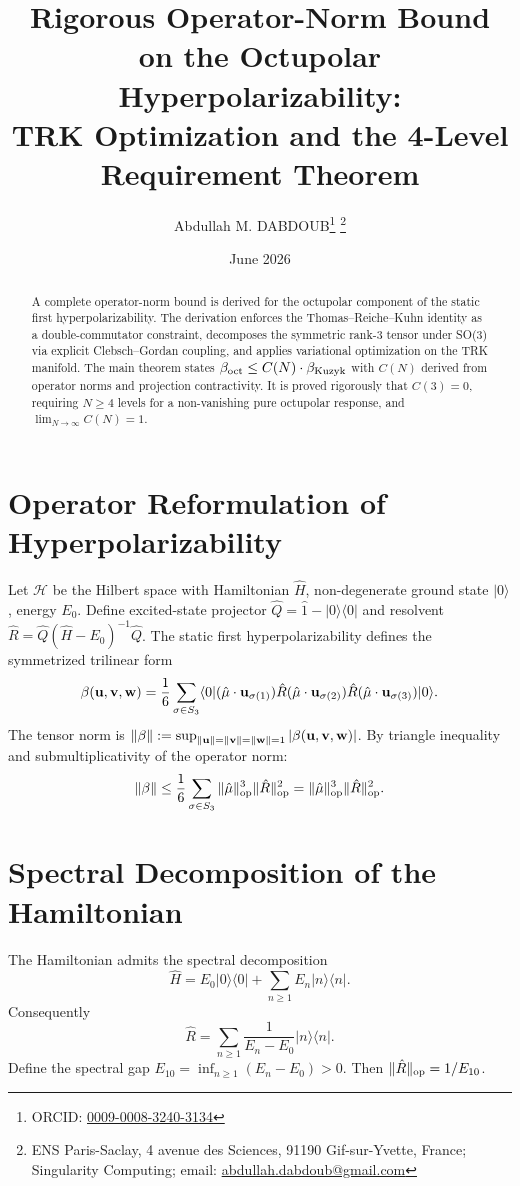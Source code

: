 \documentclass[11pt]{article}
\title{Rigorous Operator-Norm Bound on the Octupolar Hyperpolarizability:\\
TRK Optimization and the 4-Level Requirement Theorem}
\author{Abdullah M. DABDOUB\thanks{ORCID: \href{https://orcid.org/0009-0008-3240-3134}{0009-0008-3240-3134}}%
\thanks{ENS Paris-Saclay, 4 avenue des Sciences, 91190 Gif-sur-Yvette, France; Singularity Computing; email: \href{mailto:abdullah.dabdoub@gmail.com}{abdullah.dabdoub@gmail.com}}}
\date{June 2026}
\begin{document}
\maketitle

\begin{abstract}
A complete operator-norm bound is derived for the octupolar component of the static first hyperpolarizability. The derivation enforces the Thomas--Reiche--Kuhn identity as a double-commutator constraint, decomposes the symmetric rank-3 tensor under SO(3) via explicit Clebsch--Gordan coupling, and applies variational optimization on the TRK manifold. The main theorem states $\beta_{\rm oct} \le C(N) \cdot \beta_{\rm Kuzyk}$ with $C(N)$ derived from operator norms and projection contractivity. It is proved rigorously that $C(3)=0$, requiring $N \ge 4$ levels for a non-vanishing pure octupolar response, and $\lim_{N\to\infty} C(N)=1$.
\end{abstract}

\section{Operator Reformulation of Hyperpolarizability}

Let $\mathcal{H}$ be the Hilbert space with Hamiltonian $\hat{H}$, non-degenerate ground state $|0\rangle$, energy $E_0$. Define excited-state projector $\hat{Q}=\hat{1}-|0\rangle\langle0|$ and resolvent $\hat{R}=\hat{Q}(\hat{H}-E_0)^{-1}\hat{Q}$.
The static first hyperpolarizability defines the symmetrized trilinear form
\[
\beta(\vb{u},\vb{v},\vb{w})=\frac{1}{6}\sum_{\sigma \in S_3}\langle0|(\hat{\vb{\mu}}\cdot\vb{u}_{\sigma(1)})\hat{R}(\hat{\vb{\mu}}\cdot\vb{u}_{\sigma(2)})\hat{R}(\hat{\vb{\mu}}\cdot\vb{u}_{\sigma(3)})|0\rangle.
\]
The tensor norm is $\|\beta\|:=\sup_{\|\vb{u}\|=\|\vb{v}\|=\|\vb{w}\|=1}|\beta(\vb{u},\vb{v},\vb{w})|$.
By triangle inequality and submultiplicativity of the operator norm:
\[
\|\beta\|\le\frac{1}{6}\sum_{\sigma \in S_3}\|\hat{\vb{\mu}}\|_{\rm op}^3\|\hat{R}\|_{\rm op}^2 = \|\hat{\vb{\mu}}\|_{\rm op}^3\|\hat{R}\|_{\rm op}^2.
\]

\section{Spectral Decomposition of the Hamiltonian}

The Hamiltonian admits the spectral decomposition
\[
\hat{H}=E_0|0\rangle\langle0|+\sum_{n\ge1}E_n|n\rangle\langle n|.
\]
Consequently
\[
\hat{R}=\sum_{n\ge1}\frac{1}{E_n-E_0}|n\rangle\langle n|.
\]
Define the spectral gap $E_{10} = \inf_{n \ge 1} (E_n - E_0) > 0$. Then $\|\hat{R}\|_{\rm op} = 1/E_{10}$.
\end{document}
